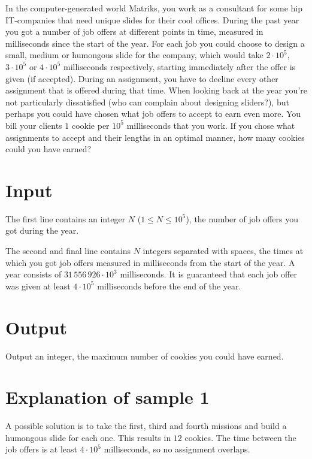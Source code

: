 In the computer-generated world Matriks, you work as a consultant for some hip IT-companies that need unique slides for their cool offices.
During the past year you got a number of job offers at different points in time, measured in milliseconds since the start of the year.
For each job you could choose to design a small, medium or humongous slide for the company, which would take $2 \cdot 10^5$, $3 \cdot 10^5$ or $4 \cdot 10^5$ milliseconds respectively, starting immediately after the offer is given (if accepted).
During an assignment, you have to decline every other assignment that is offered during that time.
When looking back at the year you're not particularly dissatisfied (who can complain about designing sliders?), but perhaps you could have chosen what job offers to accept to earn even more.
You bill your clients $1$ cookie per $10^5$ milliseconds that you work.
If you chose what assignments to accept and their lengths in an optimal manner, how many cookies could you have earned?

\section*{Input}
The first line contains an integer $N$ ($1 \le N \le 10^5$), the number of job offers you got during the year.

The second and final line contains $N$ integers separated with spaces, the times at which you got job offers measured in milliseconds from the start of the year.
A year consists of $31\,556\,926 \cdot 10^3$ milliseconds.
It is guaranteed that each job offer was given at least $4 \cdot 10^5$ milliseconds before the end of the year.

\section*{Output}
Output an integer, the maximum number of cookies you could have earned.

\section*{Explanation of sample 1}
A possible solution is to take the first, third and fourth missions and build a humongous slide for each one.
This results in $12$ cookies.
The time between the job offers is at least $4 \cdot 10^5$ milliseconds, so no assignment overlaps.
